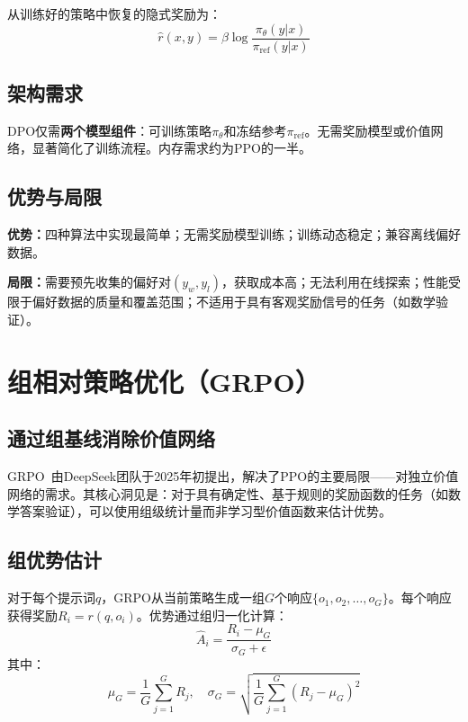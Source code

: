 从训练好的策略中恢复的隐式奖励为：
\begin{equation}
\hat{r}(x,y) = \beta\log\frac{\pi_\theta(y|x)}{\pi_{\text{ref}}(y|x)}
\end{equation}

\subsection{架构需求}

DPO仅需\textbf{两个模型组件}：可训练策略$\pi_\theta$和冻结参考$\pi_{\text{ref}}$。无需奖励模型或价值网络，显著简化了训练流程。内存需求约为PPO的一半。

\subsection{优势与局限}

\textbf{优势：}四种算法中实现最简单；无需奖励模型训练；训练动态稳定；兼容离线偏好数据。

\textbf{局限：}需要预先收集的偏好对$(y_w, y_l)$，获取成本高；无法利用在线探索；性能受限于偏好数据的质量和覆盖范围；不适用于具有客观奖励信号的任务（如数学验证）。

\section{组相对策略优化（GRPO）}
\label{sec:grpo}

\subsection{通过组基线消除价值网络}

GRPO~\cite{deepseek2025r1, shao2024deepseekmath}由DeepSeek团队于2025年初提出，解决了PPO的主要局限——对独立价值网络的需求。其核心洞见是：对于具有确定性、基于规则的奖励函数的任务（如数学答案验证），可以使用组级统计量而非学习型价值函数来估计优势。

\subsection{组优势估计}

对于每个提示词$q$，GRPO从当前策略生成一组$G$个响应$\{o_1, o_2, \ldots, o_G\}$。每个响应获得奖励$R_i = r(q, o_i)$。优势通过组归一化计算：
\begin{equation}
\hat{A}_i = \frac{R_i - \mu_G}{\sigma_G + \epsilon}
\label{eq:grpo_adv}
\end{equation}
其中：
\begin{equation}
\mu_G = \frac{1}{G}\sum_{j=1}^{G}R_j, \quad \sigma_G = \sqrt{\frac{1}{G}\sum_{j=1}^{G}(R_j - \mu_G)^2}
\end{equation}

